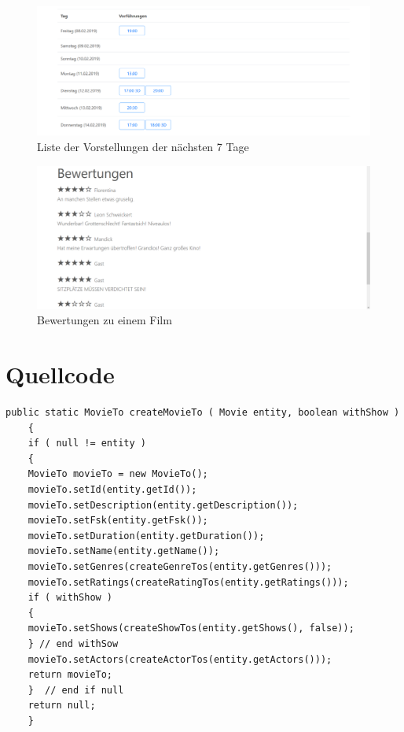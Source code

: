 \begin{figure}[ht]
	\centering
	\includegraphics[width=\textwidth]{img/screenshots/film03}
	\captionsetup{format=hang}
	\caption{Liste der Vorstellungen der nächsten 7 Tage}
	\label{fig:film03}
\end{figure}

\begin{figure}[!t]
	\centering
	\includegraphics[width=\textwidth]{img/screenshots/film04}
	\captionsetup{format=hang}
	\caption{Bewertungen zu einem Film}
	\label{fig:film04}
\end{figure}

\chapter{Quellcode}
\begin{minipage}{\linewidth}
	\begin{lstlisting}[style=lstJava]
	public static MovieTo createMovieTo ( Movie entity, boolean withShow )
	{
	if ( null != entity )
	{
	MovieTo movieTo = new MovieTo();
	movieTo.setId(entity.getId());
	movieTo.setDescription(entity.getDescription());
	movieTo.setFsk(entity.getFsk());
	movieTo.setDuration(entity.getDuration());
	movieTo.setName(entity.getName());
	movieTo.setGenres(createGenreTos(entity.getGenres()));
	movieTo.setRatings(createRatingTos(entity.getRatings()));
	if ( withShow )
	{
	movieTo.setShows(createShowTos(entity.getShows(), false));
	} // end withSow
	movieTo.setActors(createActorTos(entity.getActors()));
	return movieTo;
	}  // end if null
	return null;
	}
	\end{lstlisting}
	\label{lst:EntityToToHelper_movie}
\end{minipage}

